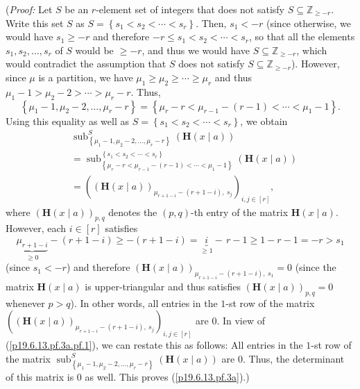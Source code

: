 \documentclass[numbers=enddot,12pt,final,onecolumn,notitlepage]{scrartcl}%
\theoremstyle{definition}
\begin{document}
\begin{enumerate}
\begin{itemize}
(\textit{Proof:} Let $S$ be an $r$-element set of integers that does not
satisfy $S\subseteq\mathbb{Z}_{\geq-r}$. Write this set $S$ as $S=\left\{
s_{1}<s_{2}<\cdots<s_{r}\right\}  $. Then, $s_{1}<-r$ (since otherwise, we
would have $s_{1}\geq-r$ and therefore $-r\leq s_{1}<s_{2}<\cdots<s_{r}$, so
that all the elements $s_{1},s_{2},\ldots,s_{r}$ of $S$ would be $\geq-r$, and
thus we would have $S\subseteq\mathbb{Z}_{\geq-r}$, which would contradict the
assumption that $S$ does not satisfy $S\subseteq\mathbb{Z}_{\geq-r}$).
However, since $\mu$ is a partition, we have $\mu_{1}\geq\mu_{2}\geq\cdots
\geq\mu_{r}$ and thus $\mu_{1}-1>\mu_{2}-2>\cdots>\mu_{r}-r$. Thus,
\[
\left\{  \mu_{1}-1,\mu_{2}-2,\ldots,\mu_{r}-r\right\}  =\left\{  \mu_{r}%
-r<\mu_{r-1}-\left(  r-1\right)  <\cdots<\mu_{1}-1\right\}  .
\]
Using this equality as well as $S=\left\{  s_{1}<s_{2}<\cdots<s_{r}\right\}
$, we obtain%
\begin{align}
&  \operatorname*{sub}\nolimits_{\left\{  \mu_{1}-1,\mu_{2}-2,\ldots,\mu
_{r}-r\right\}  }^{S}\left(  \mathbf{H}\left(  x\mid a\right)  \right)
\nonumber\\
&  =\operatorname*{sub}\nolimits_{\left\{  \mu_{r}-r<\mu_{r-1}-\left(
r-1\right)  <\cdots<\mu_{1}-1\right\}  }^{\left\{  s_{1}<s_{2}<\cdots
<s_{r}\right\}  }\left(  \mathbf{H}\left(  x\mid a\right)  \right) \nonumber\\
&  =\left(  \left(  \mathbf{H}\left(  x\mid a\right)  \right)  _{\mu
_{r+1-i}-\left(  r+1-i\right)  ,\ s_{j}}\right)  _{i,j\in\left[  r\right]  },
\label{p19.6.13.pf.3a.pf.1}%
\end{align}
where $\left(  \mathbf{H}\left(  x\mid a\right)  \right)  _{p,q}$ denotes the
$\left(  p,q\right)  $-th entry of the matrix $\mathbf{H}\left(  x\mid
a\right)  $. However, each $i\in\left[  r\right]  $ satisfies
\[
\underbrace{\mu_{r+1-i}}_{\geq0}-\left(  r+1-i\right)  \geq-\left(
r+1-i\right)  =\underbrace{i}_{\geq1}-\,r-1\geq1-r-1=-r>s_{1}%
\]
(since $s_{1}<-r$) and therefore $\left(  \mathbf{H}\left(  x\mid a\right)
\right)  _{\mu_{r+1-i}-\left(  r+1-i\right)  ,\ s_{1}}=0$ (since the matrix
$\mathbf{H}\left(  x\mid a\right)  $ is upper-triangular and thus satisfies
$\left(  \mathbf{H}\left(  x\mid a\right)  \right)  _{p,q}=0$ whenever $p>q$).
In other words, all entries in the $1$-st row of the matrix $\left(  \left(
\mathbf{H}\left(  x\mid a\right)  \right)  _{\mu_{r+1-i}-\left(  r+1-i\right)
,\ s_{j}}\right)  _{i,j\in\left[  r\right]  }$ are $0$. In view of
(\ref{p19.6.13.pf.3a.pf.1}), we can restate this as follows: All entries in
the $1$-st row of the matrix $\operatorname*{sub}\nolimits_{\left\{  \mu
_{1}-1,\mu_{2}-2,\ldots,\mu_{r}-r\right\}  }^{S}\left(  \mathbf{H}\left(
x\mid a\right)  \right)  $ are $0$. Thus, the determinant of this matrix is
$0$ as well. This proves (\ref{p19.6.13.pf.3a}).)
\end{itemize}


\end{enumerate}
\end{document}
